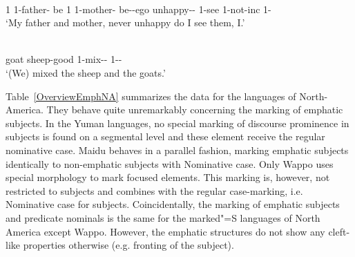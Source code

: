 \begin{exe}\ex\label{YavEmph}
\begin{xlist}
\raggedright
\ex\gll {} \textbf{}   \textbf{}      \textbf{}\\
1 1-father-\nom{} be 1 1-mother-\nom{} be-\conj{}-ego \Neg{} unhappy-\pl{}-\allo{} 1-see 1-not-inc 1-\nom{}\\
\glt `My father and mother, never unhappy do I see them, I.'

\ex\gll{}   \textbf{}\\
goat sheep-good 1-mix-\pl{}-\compl{} 1-\pl{}-\nom{}\\
\glt `(We) mixed the sheep and the goats.'
\end{xlist}\end{exe}

Table~\vref{OverviewEmphNA} summarizes the data for the languages of North-America.
They behave quite unremarkably concerning the marking of emphatic subjects.
In the Yuman languages, no special marking of discourse prominence in subjects is found on a segmental level and these element receive the regular nominative  case.
Maidu behaves in a parallel fashion, marking emphatic subjects identically to non-emphatic subjects with Nominative  case.
Only Wappo uses special morphology to mark focused elements. 
This marking is, however, not restricted to subjects and combines with the regular case-marking, i.e. Nominative case for subjects.
Coincidentally, the marking of emphatic subjects and predicate nominals is the same for the marked"=S languages of North America except Wappo.
However, the emphatic structures do not show any cleft-like properties otherwise (e.g. fronting of the subject).

